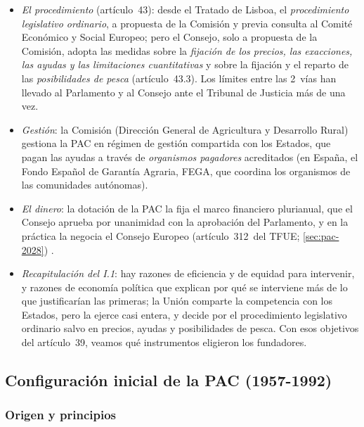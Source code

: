 \documentclass[11pt]{article}
\begin{document}
\begin{itemize}
\item \emph{El procedimiento} (artículo~43): desde el Tratado de Lisboa, el \emph{procedimiento legislativo ordinario}, a propuesta de la Comisión y previa consulta al Comité Económico y Social Europeo; pero el Consejo, solo a propuesta de la Comisión, adopta las medidas sobre la \emph{fijación de los precios, las exacciones, las ayudas y las limitaciones cuantitativas} y sobre la fijación y el reparto de las \emph{posibilidades de pesca} (artículo~43.3). Los límites entre las 2~vías han llevado al Parlamento y al Consejo ante el Tribunal de Justicia más de una vez\nocite{PE2026FichaPACTratado}.
\item \emph{Gestión}: la Comisión (Dirección General de Agricultura y Desarrollo Rural) gestiona la PAC en régimen de gestión compartida con los Estados, que pagan las ayudas a través de \emph{organismos pagadores} acreditados (en España, el Fondo Español de Garantía Agraria, FEGA, que coordina los organismos de las comunidades autónomas)\nocite{FEGA2026}.
\item \emph{El dinero}: la dotación de la PAC la fija el marco financiero plurianual, que el Consejo aprueba por unanimidad con la aprobación del Parlamento, y en la práctica la negocia el Consejo Europeo (artículo~312~del TFUE; \ref{sec:pac-2028})\nocite{UE2016TFUE} .
\end{itemize}

\begin{itemize}
\item \emph{Recapitulación del I.1}: hay razones de eficiencia y de equidad para intervenir, y razones de economía política que explican por qué se interviene más de lo que justificarían las primeras; la Unión comparte la competencia con los Estados, pero la ejerce casi entera, y decide por el procedimiento legislativo ordinario salvo en precios, ayudas y posibilidades de pesca. Con esos objetivos del artículo~39, veamos qué instrumentos eligieron los fundadores.
\end{itemize}

\subsection{Configuración inicial de la PAC (1957-1992)}\label{sec:configuracion-inicial}

\subsubsection{Origen y principios}\label{sec:origen-pac}
\end{document}
